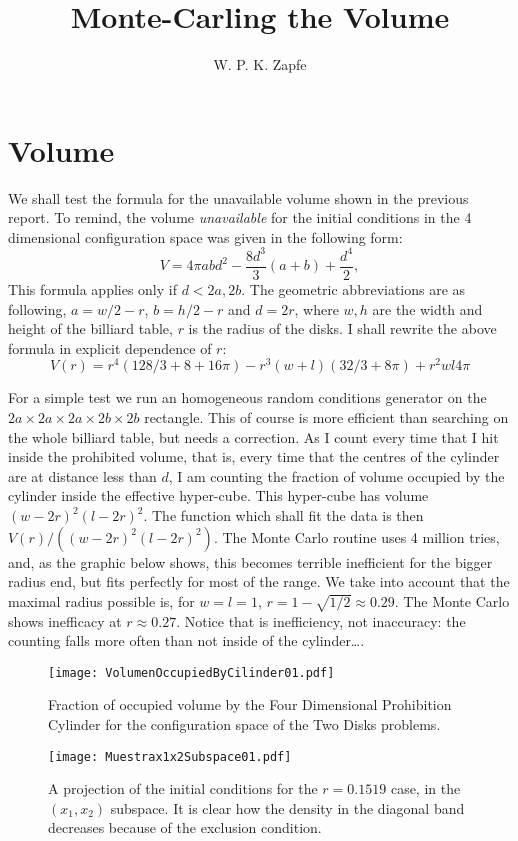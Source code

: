 \documentclass[a4paper,10pt]{article}
\title{Monte-Carling the Volume}
\author{ W. P. K. Zapfe}
\begin{document}
\maketitle

\section{Volume}

We shall test the formula for the unavailable volume shown in the 
previous report.  To remind, the volume \emph{unavailable} for
the initial conditions in the 4 dimensional configuration space was 
given in the following form:
\begin{equation}
V=4 \pi abd^2-\frac{8 d^3}{3}(a+b)+\frac{d^4}{2},
\end{equation} 
This formula applies only if $d< 2a , 2b $.
The geometric abbreviations are as following, $a=w/2-r$, $b=h/2-r$
and $d=2 r$, where $w,h$ are the width and height of the billiard table,
$r$ is the radius of the disks. I shall rewrite the above formula
in explicit dependence of $r$:
\begin{equation}
V(r)=r^4 (128/3+8+16\pi)-r^3(w+l)(32/3+8\pi)+r^2 w l 4 \pi 
\end{equation}

For a simple test we run an homogeneous random conditions generator
on the $2a\times 2a\times  2a \times 2b\times 2b$ rectangle. This of course
is more efficient than searching on the whole billiard table, but needs a correction.
As I count every time that I hit inside the prohibited volume, that is,
every time that the centres of the cylinder are at distance less than $d$,
I am counting the fraction of volume occupied by the cylinder inside
the effective hyper-cube. This hyper-cube has volume $(w-2r)^2 (l-2r)^2$.
The function which shall fit the data is then $V(r)/((w-2r)^2 (l-2r)^2)$.
The Monte Carlo routine uses 4 million tries, and, as the graphic below shows,
this becomes terrible inefficient for the bigger radius end, but fits perfectly for most
of the range. We take into account that the maximal radius possible
is, for $w=l=1$, $r=1-\sqrt{1/2}\approx 0.29$. The Monte Carlo shows inefficacy at
$r\approx 0.27$. Notice that is inefficiency, not inaccuracy: the counting falls
more often than not inside of the cylinder\ldots.


\begin{figure}
\centering
\texttt{[image: VolumenOccupiedByCilinder01.pdf]}
\caption{Fraction of occupied volume by the 
Four Dimensional Prohibition Cylinder for the configuration space of the 
Two Disks problems.}
\end{figure}

\begin{figure}
\centering
\texttt{[image: Muestrax1x2Subspace01.pdf]}
\caption{ A projection of the initial conditions for the $r=0.1519$ case, in the
$(x_1,x_2)$ subspace. It is clear how the density in the diagonal band decreases
because of the exclusion condition. }
\end{figure}
\end{document}
